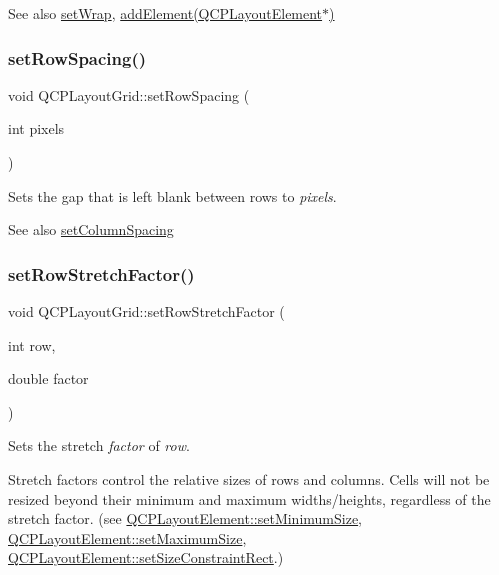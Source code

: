 \begin{DoxySeeAlso}{See also}
\hyperlink{classQCPLayoutGrid_ab36af18d77e4428386d02970382ee598}{set\+Wrap}, \hyperlink{classQCPLayoutGrid_a4c44025dd25acd27e053cadfd448ad7b}{add\+Element(\+Q\+C\+P\+Layout\+Element$\ast$)} 
\end{DoxySeeAlso}
\mbox{\label{classQCPLayoutGrid_aaef2cd2d456197ee06a208793678e436}} 
\subsubsection{\texorpdfstring{set\+Row\+Spacing()}{setRowSpacing()}}
{\footnotesize\ttfamily void Q\+C\+P\+Layout\+Grid\+::set\+Row\+Spacing (\begin{DoxyParamCaption}\item[{int}]{pixels }\end{DoxyParamCaption})}

Sets the gap that is left blank between rows to {\itshape pixels}.

\begin{DoxySeeAlso}{See also}
\hyperlink{classQCPLayoutGrid_a3a49272aba32bb0fddc3bb2a45a3dba0}{set\+Column\+Spacing} 
\end{DoxySeeAlso}
\mbox{\label{classQCPLayoutGrid_a7b0273de5369bd93d942edbaf5b166ec}} 
\subsubsection{\texorpdfstring{set\+Row\+Stretch\+Factor()}{setRowStretchFactor()}}
{\footnotesize\ttfamily void Q\+C\+P\+Layout\+Grid\+::set\+Row\+Stretch\+Factor (\begin{DoxyParamCaption}\item[{int}]{row,  }\item[{double}]{factor }\end{DoxyParamCaption})}

Sets the stretch {\itshape factor} of {\itshape row}.

Stretch factors control the relative sizes of rows and columns. Cells will not be resized beyond their minimum and maximum widths/heights, regardless of the stretch factor. (see \hyperlink{classQCPLayoutElement_a5dd29a3c8bc88440c97c06b67be7886b}{Q\+C\+P\+Layout\+Element\+::set\+Minimum\+Size}, \hyperlink{classQCPLayoutElement_a74eb5280a737ab44833d506db65efd95}{Q\+C\+P\+Layout\+Element\+::set\+Maximum\+Size}, \hyperlink{classQCPLayoutElement_a361666cdcc6fbfd37344cc44be746b0f}{Q\+C\+P\+Layout\+Element\+::set\+Size\+Constraint\+Rect}.)

